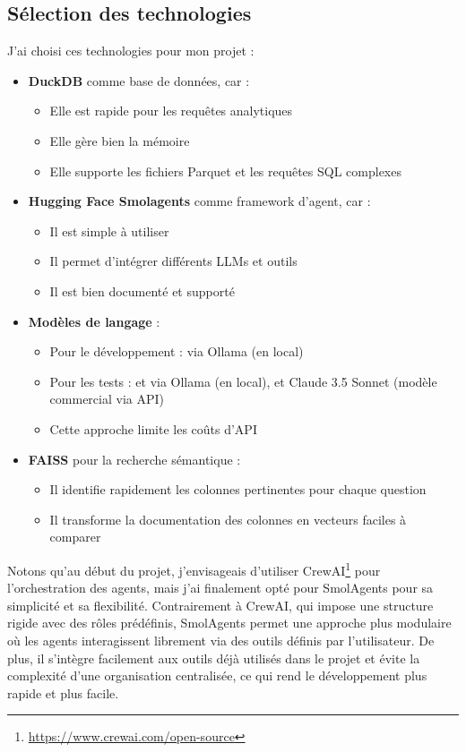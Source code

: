 \documentclass[a4paper,11pt]{article}
\begin{document}
\subsection{Sélection des technologies}

J'ai choisi ces technologies pour mon projet :

\begin{itemize}
    \item \textbf{DuckDB} comme base de données, car :
    \begin{itemize}
        \item Elle est rapide pour les requêtes analytiques
        \item Elle gère bien la mémoire
        \item Elle supporte les fichiers Parquet et les requêtes SQL complexes
    \end{itemize}
    \item \textbf{Hugging Face Smolagents} comme framework d'agent, car :
    \begin{itemize}
        \item Il est simple à utiliser
        \item Il permet d'intégrer différents LLMs et outils
        \item Il est bien documenté et supporté
    \end{itemize}
    \item \textbf{Modèles de langage} :
    \begin{itemize}
        \item Pour le développement :  via Ollama (en local)
        \item Pour les tests :  et  via Ollama (en local), et Claude 3.5 Sonnet (modèle commercial via API)
        \item Cette approche limite les coûts d'API
    \end{itemize}
    \item \textbf{FAISS} pour la recherche sémantique :
    \begin{itemize}
        \item Il identifie rapidement les colonnes pertinentes pour chaque question
        \item Il transforme la documentation des colonnes en vecteurs faciles à comparer
    \end{itemize}
\end{itemize}

Notons qu'au début du projet, j'envisageais d'utiliser CrewAI\footnote{\url{https://www.crewai.com/open-source}} pour l'orchestration des agents, mais j'ai finalement opté pour SmolAgents pour sa simplicité et sa flexibilité.
Contrairement à CrewAI, qui impose une structure rigide avec des rôles prédéfinis, SmolAgents permet une approche plus modulaire où les agents interagissent librement via des outils définis par l’utilisateur. 
De plus, il s’intègre facilement aux outils déjà utilisés dans le projet et évite la complexité d’une organisation centralisée, ce qui rend le développement plus rapide et plus facile.
\end{document}
